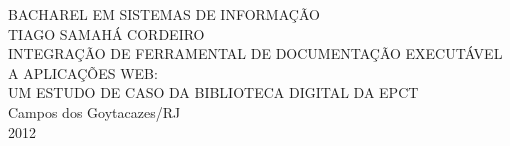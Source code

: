 \begin{titlepage}
 \begin{figure}[ht]
 \centering
 \end{figure}
 \begin{center}
   {\large BACHAREL EM SISTEMAS DE INFORMAÇÃO} \\ [3.5cm]
   {\large TIAGO SAMAHÁ CORDEIRO} \\ [4cm]
   {\large INTEGRAÇÃO DE FERRAMENTAL DE DOCUMENTAÇÃO EXECUTÁVEL A APLICAÇÕES WEB:} \\ [0.5cm]
   {\small UM ESTUDO DE CASO DA BIBLIOTECA DIGITAL DA EPCT} \\
   \vfill
   {\large Campos dos Goytacazes/RJ} \\
   {\large 2012}
 \end{center}
\end{titlepage}